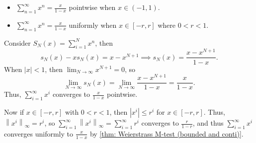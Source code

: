 \begin{eg}
    \vphantom{text}
    \begin{itemize}
        \item \(\sum_{n=1}^{\infty} x^n = \frac{x}{1-x} \) pointwise when \(x \in (-1, 1)\). 
        \item \(\sum_{n=1}^{\infty} x^n = \frac{x}{1-x} \) uniformly when \(x \in [-r, r]\) where \(0 < r < 1\).     
    \end{itemize}
\end{eg}
\begin{explanation}
    Consider \(S_N(x) = \sum_{i=1}^N x^n \), then 
    \[
        s_N(x) - x s_N(x) = x - x^{N+1} \implies s_N(x) = \frac{x - x^{N+1}}{1-x}.
    \] 
    When \(\vert x \vert < 1 \), then \(\lim_{N \to \infty} x^{N+1}  = 0\), so 
    \[
        \lim_{N \to \infty} s_N(x) = \lim_{N \to \infty} \frac{x - x^{N+1}}{1-x} = \frac{x}{1-x}.  
    \] 
    Thus, \(\sum_{i=1}^{\infty} x^i \) converges to \(\frac{x}{1-x}\) pointwise. 
    
    Now if \(x \in [-r, r]\) with \(0 < r < 1\), then \(\left\vert x^i \right\vert \le r^i \) for \(x \in [-r, r]\). Thus, \(\left\lVert x^i \right\rVert _\infty = r^i \), so \(\sum_{i=1}^{\infty} \left\lVert x^i \right\rVert_{\infty } = \sum_{i=1}^{\infty} r^i \) converges to \(\frac{r}{1-r}\), and thus \(\sum_{i=1}^{\infty} x^i \) converges uniformly to \(\frac{x}{1-x}\) by \autoref{thm: Weierstrass M-test (bounded and conti)}.        
\end{explanation}